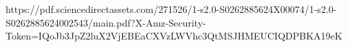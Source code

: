 https://pdf.sciencedirectassets.com/271526/1-s2.0-S0262885624X00074/1-s2.0-S0262885624002543/main.pdf?X-Amz-Security-Token=IQoJb3JpZ2luX2VjEBEaCXVzLWVhc3QtMSJHMEUCIQDPBKA19eK%

